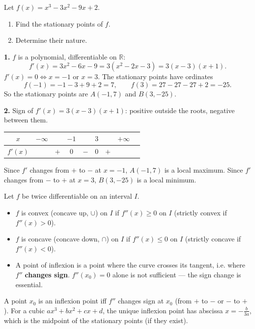 \documentclass[11pt]{article}
\newcommand{\cle}[1]{{\popxbold\color{popdark}#1}}
\begin{document}
\begin{exoresolu}
Let $f(x)=x^3-3x^2-9x+2$.
\begin{enumerate}
\item Find the stationary points of $f$.
\item Determine their nature.
\end{enumerate}
\tcblower
\textbf{1.} $f$ is a polynomial, differentiable on $\mathbb{R}$:
\[ f'(x)=3x^2-6x-9=3(x^2-2x-3)=3(x-3)(x+1). \]
$f'(x)=0\iff x=-1$ or $x=3$. The stationary points have ordinates
\[ f(-1)=-1-3+9+2=7, \qquad f(3)=27-27-27+2=-25. \]
So the stationary points are $A(-1,7)$ and $B(3,-25)$.

\textbf{2.} Sign of $f'(x)=3(x-3)(x+1)$: positive outside the roots, negative between them.
\begin{center}
\begin{tabular}{|c|cccccccc|}
\hline
$x$ & $-\infty$ & & $-1$ & & $3$ & & $+\infty$ \\
\hline
$f'(x)$ & & $+$ & $0$ & $-$ & $0$ & $+$ & \\
\hline
\end{tabular}
\end{center}
Since $f'$ changes from $+$ to $-$ at $x=-1$, $A(-1,7)$ is a \cle{local maximum}. Since $f'$ changes from $-$ to $+$ at $x=3$, $B(3,-25)$ is a \cle{local minimum}.
\end{exoresolu}

\begin{definition}
Let $f$ be twice differentiable on an interval $I$.
\begin{itemize}
\item $f$ is \cle{convex} (concave up, $\cup$) on $I$ if $f''(x)\geq0$ on $I$ (strictly convex if $f''(x)>0$).
\item $f$ is \cle{concave} (concave down, $\cap$) on $I$ if $f''(x)\leq0$ on $I$ (strictly concave if $f''(x)<0$).
\item A \cle{point of inflexion} is a point where the curve crosses its tangent, i.e. where $f''$ \textbf{changes sign}. $f''(x_0)=0$ alone is not sufficient — the sign change is essential.
\end{itemize}
\end{definition}

\begin{aretenir}
A point $x_0$ is an inflexion point iff $f''$ changes sign at $x_0$ (from $+$ to $-$ or $-$ to $+$). For a cubic $ax^3+bx^2+cx+d$, the unique inflexion point has abscissa $x=-\frac{b}{3a}$, which is the midpoint of the stationary points (if they exist).
\end{aretenir}
\end{document}
